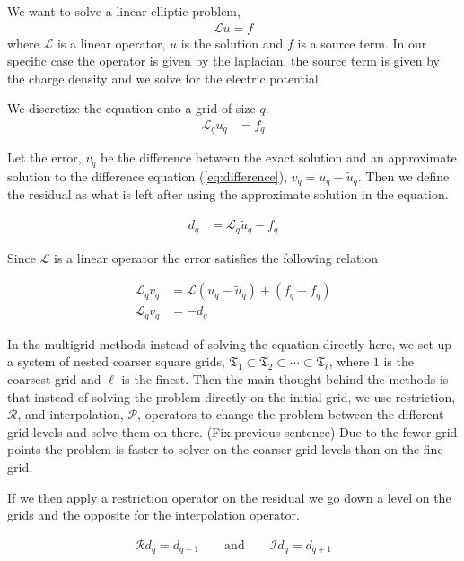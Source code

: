 	We want to solve a linear elliptic problem,
		\begin{align}
			\mathcal{L} u = f
		\end{align}
	where \(\mathcal{L}\) is a linear operator, \(u\) is the solution and \(f\) is
  a source term. In our specific case the operator is given by the laplacian, the
  source term is given by the charge density and we solve for the electric potential.

	We discretize the equation onto a grid of size \(q\).
	\begin{align}
		\mathcal{L}_q u_q &= f_q \label{eq:difference}
	\end{align}

	Let the error, \(v_q\) be the difference between the exact solution and an approximate
  solution to the difference equation (\ref{eq:difference}), \( v_q = u_q - \tilde{u}_q \).
  Then we define the residual as what is left after using the approximate solution
  in the equation.

	\begin{align}
		d_q &= \mathcal{L}_q \tilde{u}_q - f_q
	\end{align}

	Since \(\mathcal{L}\) is a linear operator the error satisfies the following relation

	\begin{align}
		\mathcal{L}_q v_q &= \mathcal{L}(u_q - \tilde{u}_q)  + (f_q- f_q)
		\\
		\mathcal{L}_q v_q &= - d_q \label{eq:diff_MG}
	\end{align}

	In the multigrid methods instead of solving the equation directly here, we set
	up a system of nested coarser square grids,
	\(\mathfrak{T}_1 \subset \mathfrak{T}_2 \subset \cdots \subset \mathfrak{T}_\ell\),
	where \(1\) is the coarsest grid and \(\ell\) is the finest. Then the main thought
	behind the methods is that instead of solving the problem directly on the initial
	grid, we use restriction, \( \mathcal{R} \), and interpolation, \( \mathcal{P} \),
	operators to change the problem between the different grid levels and solve them
	on there. (Fix previous sentence) Due to the fewer grid points the problem is
	faster to solver on the coarser grid levels than on the fine grid.

	If we then apply a restriction operator on the residual we go down a level on
	the grids and the opposite for the interpolation operator.

	\begin{align}
		\mathcal{R} d_q = d_{q-1} \qquad \text{and} \qquad \mathcal{I} d_q = d_{q + 1}
	\end{align}


